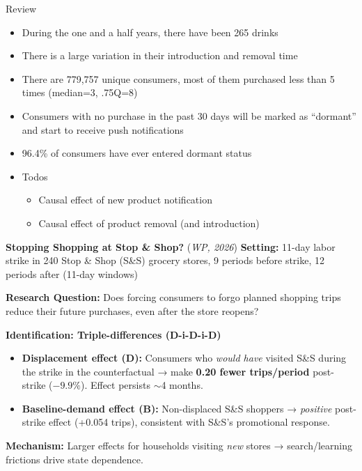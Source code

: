 \documentclass[aspectratio=169]{beamer}  %
\begin{document}
\begin{frame}{Review}
\begin{itemize}
    \item During the one and a half years, there have been 265 drinks
    \item There is a large variation in their introduction and removal time
    \item There are 779,757 unique consumers, most of them purchased less than 5 times (median=3, .75Q=8)
    \item Consumers with no purchase in the past 30 days will be marked as ``dormant'' and start to receive push notifications
    \item 96.4\% of consumers have ever entered dormant status 
    \item Todos
    \begin{itemize}
        \item Causal effect of new product notification
        \item[*] Causal effect of product removal (and introduction)
    \end{itemize}
\end{itemize}    
\end{frame}

\begin{frame}{\textbf{Stopping Shopping at Stop \& Shop?} (\textit{WP, 2026})}
\textbf{Setting:} 11-day labor strike in 240 Stop \& Shop (S\&S) grocery stores, 9 periods before strike, 12 periods after (11-day windows)

\vspace{0.2cm}
\textbf{Research Question:} Does forcing consumers to forgo planned shopping trips reduce their future purchases, even after the store reopens?

\vspace{0.2cm}
\textbf{Identification: Triple-differences (D-i-D-i-D)}
\begin{itemize}
    \item \textbf{Displacement effect (D):} Consumers who \textit{would have} visited S\&S during the strike in the counterfactual → make \textbf{0.20 fewer trips/period} post-strike ($-9.9\%$). Effect persists $\sim$4 months.
    \item \textbf{Baseline-demand effect (B):} Non-displaced S\&S shoppers → \textit{positive} post-strike effect (+0.054 trips), consistent with S\&S's promotional response.
\end{itemize}

\vspace{0.2cm}
\textbf{Mechanism:} Larger effects for households visiting \textit{new} stores → search/learning frictions drive state dependence.
\end{frame}
\end{document}

